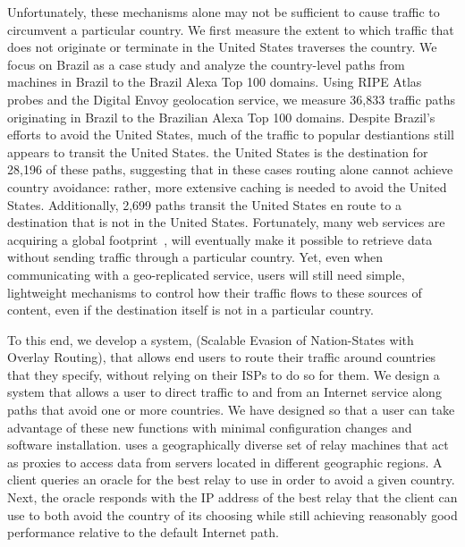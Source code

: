 Unfortunately, these mechanisms alone may not be sufficient to cause
traffic to circumvent a particular country. 
We first measure the extent to which traffic that does not
originate or terminate in the United States traverses the country. We
focus on Brazil as a case study and analyze the country-level paths from
machines in Brazil to the Brazil Alexa Top 100 domains. Using RIPE Atlas
probes and the Digital Envoy geolocation service, we measure 36,833
traffic paths originating in Brazil to the Brazilian Alexa Top 100
domains. Despite Brazil's efforts to avoid the United States, much of
the traffic to popular destiantions still appears to transit the United
States. the United States is the destination for 28,196 of these paths,
suggesting that in these cases routing alone cannot achieve country
avoidance: rather, more extensive caching is needed to avoid the United
States. Additionally, 2,699 paths transit the United States en route to
a destination that is not in the United States.  Fortunately, many web
services are acquiring a global footprint~\cite{eu_datacenters}, will
eventually make it possible to retrieve data without sending traffic
through a particular country. Yet, even when communicating with a
geo-replicated service, users will still need simple, lightweight
mechanisms to control how their traffic flows to these sources of
content, even if the destination itself is not in a particular country.

To this end, we develop a system, \system{} (Scalable Evasion of
Nation-States with Overlay Routing), that allows end users to
route their traffic around countries that they specify, without relying
on their ISPs to do so for them. We design a system that allows a user
to direct traffic to and from an Internet service along paths that avoid
one or more countries. We have designed \system{} so that a user can
take advantage of these new functions with minimal configuration changes
and software installation.  \system{} uses a geographically diverse set
of relay machines that act as proxies to access data from servers
located in different geographic regions.  A client queries an oracle for
the best relay to use in order to avoid a given country.  Next, the
oracle responds with the IP address of the best relay that the client
can use to both avoid the country of its choosing while still achieving
reasonably good performance relative to the default Internet path.

